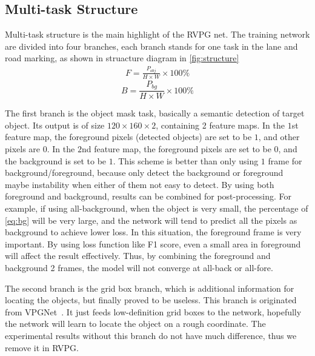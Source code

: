 \begin{spacing}{1.5}
\subsection{Multi-task Structure}
\label{subsec:multitask}

Multi-task structure is the main highlight of the RVPG net. The training network are divided into four branches, each branch stands for one task in the lane and road marking, as shown in struacture diagram in \autoref{fig:structure}
\begin{align}
    F = \frac{P_{obj}}{H \times W} \times 100\% \label{eq:fore}
\end{align}
\vspace{-7mm}
\begin{equation}
    B = \frac{P_{bg}}{H \times W} \times 100\% \label{eq:bg}
\end{equation}

The first branch is the object mask task, basically a semantic detection of target object. Its output is of size $120 \times 160 \times 2$, containing 2 feature maps. In the $1$st feature map, the foreground pixels (detected objects) are set to be $1$, and other pixels are $0$. In the $2$nd feature map, the foreground pixels are set to be $0$, and the background is set to be $1$. This scheme is better than only using $1$ frame for background/foreground, because only detect the background or foreground maybe instability when either of them not easy to detect. By using both foreground and background, results can be combined for post-processing. For example, if using all-background, when the object is very small, the percentage of \autoref{eq:bg} will be very large, and the network will tend to predict all the pixels as background to achieve lower loss. In this situation, the foreground frame is very important. By using loss function like F1 score, even a small area in foreground will affect the result effectively. Thus, by combining the foreground and background 2 frames, the model will not converge at all-back or all-fore.

The second branch is the grid box branch, which is additional information for locating the objects, but finally proved to be useless. This branch is originated from VPGNet~\cite{lee2017vpgnet}. It just feeds low-definition grid boxes to the network, hopefully the network will learn to locate the object on a rough coordinate. The experimental results without this branch do not have much difference, thus we remove it in RVPG.


\end{spacing}
